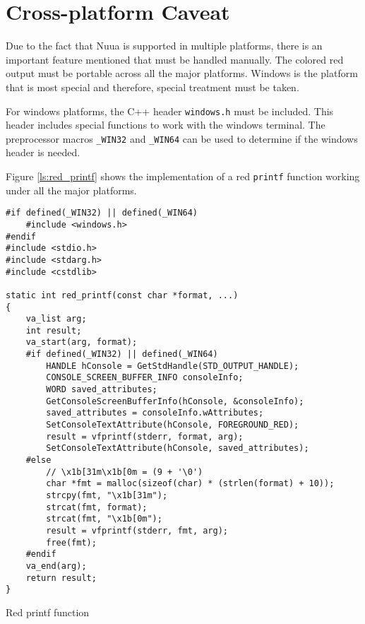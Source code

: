 \section{Cross-platform Caveat}

Due to the fact that Nuua is supported in multiple platforms, there is an important feature mentioned that must be
handled manually. The colored red output must be portable across all the major platforms. Windows is the platform that
is most special and therefore, special treatment must be taken.

For windows platforms, the C++ header \texttt{windows.h} must be included.
This header includes special functions to work with the windows terminal. The preprocessor macros
\texttt{\_WIN32} and \texttt{\_WIN64} can be used to determine if the windows header is needed.

Figure \autoref{ls:red_printf} shows the implementation of a red \texttt{printf} function working under all the major
platforms.

\begin{listing}[H]
\begin{verbatim}
#if defined(_WIN32) || defined(_WIN64)
    #include <windows.h>
#endif
#include <stdio.h>
#include <stdarg.h>
#include <cstdlib>

static int red_printf(const char *format, ...)
{
    va_list arg;
    int result;
    va_start(arg, format);
    #if defined(_WIN32) || defined(_WIN64)
        HANDLE hConsole = GetStdHandle(STD_OUTPUT_HANDLE);
        CONSOLE_SCREEN_BUFFER_INFO consoleInfo;
        WORD saved_attributes;
        GetConsoleScreenBufferInfo(hConsole, &consoleInfo);
        saved_attributes = consoleInfo.wAttributes;
        SetConsoleTextAttribute(hConsole, FOREGROUND_RED);
        result = vfprintf(stderr, format, arg);
        SetConsoleTextAttribute(hConsole, saved_attributes);
    #else
        // \x1b[31m\x1b[0m = (9 + '\0')
        char *fmt = malloc(sizeof(char) * (strlen(format) + 10));
        strcpy(fmt, "\x1b[31m");
        strcat(fmt, format);
        strcat(fmt, "\x1b[0m");
        result = vfprintf(stderr, fmt, arg);
        free(fmt);
    #endif
    va_end(arg);
    return result;
}
\end{verbatim}
\caption{Red printf function}
\label{ls:red_printf}
\end{listing}
